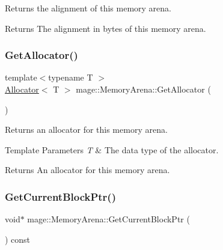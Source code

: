 Returns the alignment of this memory arena.

\begin{DoxyReturn}{Returns}
The alignment in bytes of this memory arena. 
\end{DoxyReturn}
\mbox{\label{classmage_1_1_memory_arena_a20e4f7201a46f09a4f964a7214aa91cc}} 
\subsubsection{\texorpdfstring{Get\+Allocator()}{GetAllocator()}}
{\footnotesize\ttfamily template$<$typename T $>$ \\
\mbox{\hyperlink{classmage_1_1_memory_arena_1_1_allocator}{Allocator}}$<$ T $>$ mage\+::\+Memory\+Arena\+::\+Get\+Allocator (\begin{DoxyParamCaption}{ }\end{DoxyParamCaption})\hspace{0.3cm}{\ttfamily [noexcept]}}

Returns an allocator for this memory arena.


\begin{DoxyTemplParams}{Template Parameters}
{\em T} & The data type of the allocator. \\
\hline
\end{DoxyTemplParams}
\begin{DoxyReturn}{Returns}
An allocator for this memory arena. 
\end{DoxyReturn}
\mbox{\label{classmage_1_1_memory_arena_a7bdbc9da32c1f8d49ce5d2f153870284}} 
\subsubsection{\texorpdfstring{Get\+Current\+Block\+Ptr()}{GetCurrentBlockPtr()}}
{\footnotesize\ttfamily void$\ast$ mage\+::\+Memory\+Arena\+::\+Get\+Current\+Block\+Ptr (\begin{DoxyParamCaption}{ }\end{DoxyParamCaption}) const\hspace{0.3cm}{\ttfamily [noexcept]}}


